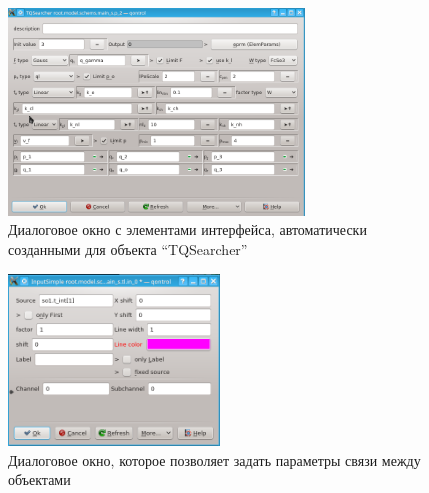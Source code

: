\begin{figure}[htb!]
  \begin{center}
    \includegraphics[width=0.7\textwidth]{p/qontrol_tqsearch.png}
  \end{center}
  \caption{Диалоговое окно с элементами интерфейса, автоматически созданными для объекта ``TQSearcher''}
  \label{atu:f:qontrol_qsearch}
\end{figure}



\begin{figure}[htb!]
  \begin{center}
    \includegraphics[width=0.5\textwidth]{p/qontrol_link.png}
  \end{center}
  \caption{Диалоговое окно, которое позволяет задать параметры связи между объектами}
  \label{atu:f:qontrol_link}
\end{figure}


